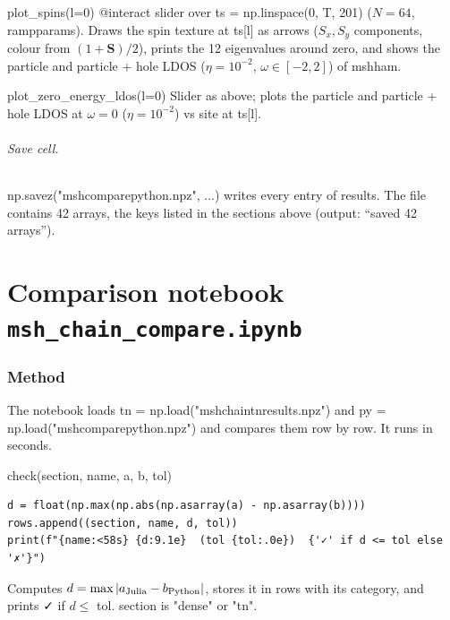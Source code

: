 \documentclass[11pt]{article}
\newcommand{\nb}[1]{\texttt{#1}}
\newcommand{\codeus}{\textunderscore\allowbreak}
\renewcommand{\code}[1]{{\ttfamily\let\_\codeus #1}}
\begin{document}
\begin{function}{plot\_spins(l=0)}
\code{@interact} slider over \code{ts = np.linspace(0, T, 201)} ($N=64$, \code{ramp\_params}). Draws the spin texture at \code{ts[l]} as arrows ($S_x,S_y$ components, colour from $(1+\mathbf S)/2$), prints the 12 eigenvalues around zero, and shows the particle and particle + hole LDOS ($\eta=10^{-2}$, $\omega\in[-2,2]$) of \code{msh\_ham}.
\end{function}

\begin{function}{plot\_zero\_energy\_ldos(l=0)}
Slider as above; plots the particle and particle + hole LDOS at $\omega=0$ ($\eta=10^{-2}$) vs site at \code{ts[l]}.
\end{function}

\paragraph{Save cell.} \code{np.savez("msh\_compare\_python.npz", ...)} writes every entry of \code{results}. The file contains 42 arrays, the keys listed in the sections above (output: ``saved 42 arrays'').

\clearpage
\part{Comparison notebook \texorpdfstring{\nb{msh\_chain\_compare.ipynb}}{msh\_chain\_compare.ipynb}}

\section{Method}

The notebook loads \code{tn = np.load("msh\_chain\_tn\_results.npz")} and \code{py = np.load("msh\_compare\_python.npz")} and compares them row by row. It runs in seconds.

\begin{function}{check(section, name, a, b, tol)}
\begin{Verbatim}
d = float(np.max(np.abs(np.asarray(a) - np.asarray(b))))
rows.append((section, name, d, tol))
print(f"{name:<58s} {d:9.1e}  (tol {tol:.0e})  {'✓' if d <= tol else '✗'}")
\end{Verbatim}
Computes $d=\max|a_{\rm Julia}-b_{\rm Python}|$, stores it in \code{rows} with its category, and prints ✓ if $d\le$ \code{tol}. \code{section} is \code{"dense"} or \code{"tn"}.
\end{function}
\end{document}
